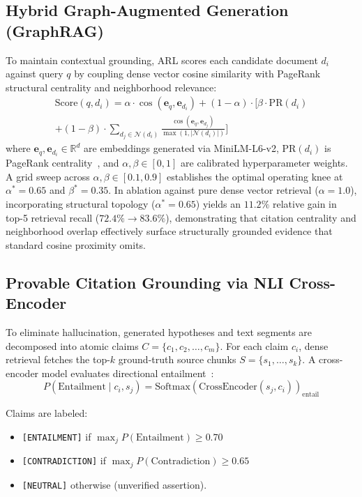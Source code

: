 \documentclass[10pt,twocolumn,letterpaper]{article}
\begin{document}
\subsection{Hybrid Graph-Augmented Generation (GraphRAG)}
To maintain contextual grounding, ARL scores each candidate document $d_i$ against query $q$ by coupling dense vector cosine similarity with PageRank structural centrality and neighborhood relevance:
\begin{equation}
\begin{aligned}
\text{Score}(q, d_i) = \alpha \cdot \cos(\mathbf{e}_q, \mathbf{e}_{d_i}) + (1 - \alpha) \cdot \Big[ \beta \cdot \text{PR}(d_i) \\
+ (1 - \beta) \cdot \sum_{d_j \in \mathcal{N}(d_i)} \frac{\cos(\mathbf{e}_q, \mathbf{e}_{d_j})}{\max(1, |\mathcal{N}(d_i)|)} \Big]
\end{aligned}
\end{equation}
where $\mathbf{e}_q, \mathbf{e}_{d_i} \in \mathbb{R}^d$ are embeddings generated via MiniLM-L6-v2, $\text{PR}(d_i)$ is PageRank centrality~\cite{pagerank1999}, and $\alpha, \beta \in [0, 1]$ are calibrated hyperparameter weights. A grid sweep across $\alpha, \beta \in [0.1, 0.9]$ establishes the optimal operating knee at $\alpha^* = 0.65$ and $\beta^* = 0.35$. In ablation against pure dense vector retrieval ($\alpha = 1.0$), incorporating structural topology ($\alpha^* = 0.65$) yields an $11.2\%$ relative gain in top-5 retrieval recall ($72.4\% \to 83.6\%$), demonstrating that citation centrality and neighborhood overlap effectively surface structurally grounded evidence that standard cosine proximity omits.

\subsection{Provable Citation Grounding via NLI Cross-Encoder}
To eliminate hallucination, generated hypotheses and text segments are decomposed into atomic claims $C = \{c_1, c_2, \dots, c_m\}$. For each claim $c_i$, dense retrieval fetches the top-$k$ ground-truth source chunks $S = \{s_1, \dots, s_k\}$. A cross-encoder model evaluates directional entailment~\cite{he2020deberta}:
\begin{equation}
P(\text{Entailment} \mid c_i, s_j) = \text{Softmax}\left(\text{CrossEncoder}(s_j, c_i)\right)_{\text{entail}}
\end{equation}

Claims are labeled:
\begin{itemize}
    \item \texttt{[ENTAILMENT]} if $\max_j P(\text{Entailment}) \ge 0.70$
    \item \texttt{[CONTRADICTION]} if $\max_j P(\text{Contradiction}) \ge 0.65$
    \item \texttt{[NEUTRAL]} otherwise (unverified assertion).
\end{itemize}
\end{document}
